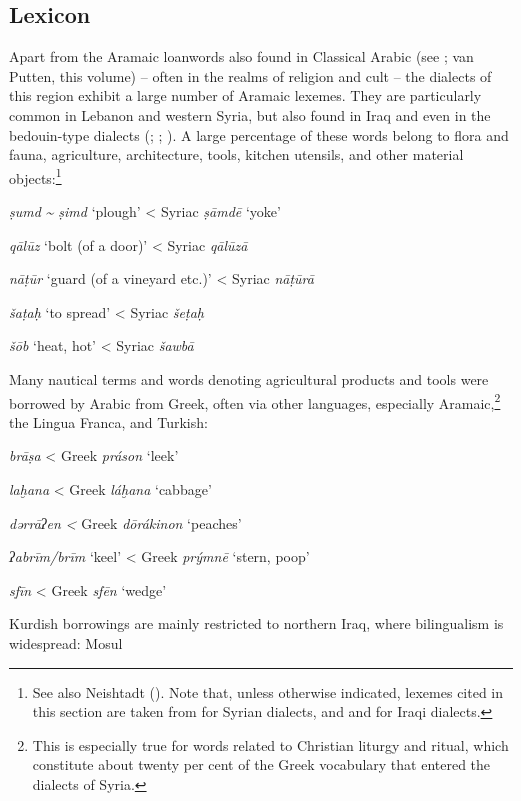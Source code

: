 \documentclass[output=paper]{langsci/langscibook}
\begin{document}
  \subsection{Lexicon} 
Apart from the Aramaic loanwords also found in Classical Arabic (see \citealt{Retsö2011}; van Putten, this volume) – often in the realms of religion and cult – the dialects of this region exhibit a large number of Aramaic lexemes. They are particularly common in Lebanon and western Syria, but also found in Iraq and even in the bedouin-type dialects (\citealt{Féghali1918}; \citealt{Borg2004}; \citeyear{Borg2008}). A large percentage of these words belong to flora and fauna, agriculture, architecture, tools, kitchen utensils, and other material objects:\footnote{See also Neishtadt (\citeyear[282]{Neishtadt2015}). Note that, unless otherwise indicated, lexemes cited in this section are taken from \citet{Barthélemy1935} for Syrian dialects, and \citet{WoodheadEtAl1967} and \citet{alBakri1972} for Iraqi dialects.}

\ea
\textit{ṣumd} \textit{{\textasciitilde} ṣimd} ‘plough’ < Syriac \textit{ṣāmdē} ‘yoke’

\textit{qālūz} ‘bolt (of a door)’ < Syriac \textit{qālūzā}

\textit{nāṭūr} ‘guard (of a vineyard etc.)’ < Syriac \textit{nāṭūrā}

\textit{šaṭaḥ} ‘to spread’ < Syriac \textit{šeṭaḥ}

\textit{šōb} ‘heat, hot’ < Syriac \textit{šawbā}
\z

Many nautical terms and words denoting agricultural products and tools were borrowed by Arabic from Greek, often via other languages, especially Aramaic,\footnote{This is especially true for words related to Christian liturgy and ritual, which constitute about twenty per cent of the Greek vocabulary that entered the dialects of Syria.} the Lingua Franca, and Turkish: 

\ea
\textit{brāṣa} < Greek \textit{práson} ‘leek’ 

\textit{laḫana} < Greek \textit{láḫana} ‘cabbage’

\textit{dərrāʔen} \textit{<} Greek \textit{dōrákinon} ‘peaches’

\textit{ʔabrīm/brīm} ‘keel’ < Greek \textit{prýmnē} ‘stern, poop’

\textit{sfīn} < Greek \textit{sfēn} ‘wedge’
\z

Kurdish borrowings are mainly restricted to northern Iraq, where bilingualism is widespread: 
\ea
Mosul
\end{document}
